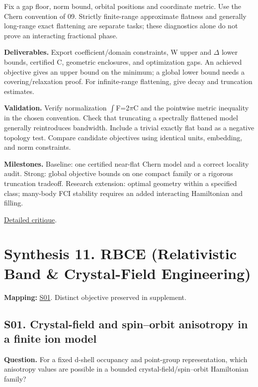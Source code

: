 \documentclass[
  11pt,
]{article}
\begin{document}
Fix a gap floor, norm bound, orbital positions and coordinate metric.
Use the Chern convention of 09. Strictly finite-range approximate
flatness and generally long-range exact flattening are separate tasks;
these diagnostics alone do not prove an interacting fractional phase.

\textbf{Deliverables.} Export coefficient/domain constraints, W upper
and \ensuremath{\Delta} lower bounds, certified C, geometric enclosures,
and optimization gaps. An achieved objective gives an upper bound on the
minimum; a global lower bound needs a covering/relaxation proof. For
infinite-range flattening, give decay and truncation estimates.

\textbf{Validation.} Verify normalization
\ensuremath{\int}F=2\ensuremath{\pi}C and the pointwise metric
inequality in the chosen convention. Check that truncating a spectrally
flattened model generally reintroduces bandwidth. Include a trivial
exactly flat band as a negative topology test. Compare candidate
objectives using identical units, embedding, and norm constraints.

\textbf{Milestones.} Baseline: one certified near-flat Chern model and a
correct locality audit. Strong: global objective bounds on one compact
family or a rigorous truncation tradeoff. Research extension: optimal
geometry within a specified class; many-body FCI stability requires an
added interacting Hamiltonian and filling.

\href{https://github.com/rick-stevens-ai/Pure-Thought/blob/main/reviews/10-Flat-Chern-Bands.md}{Detailed
critique}.

\section{Synthesis 11. RBCE (Relativistic Band \& Crystal-Field
Engineering)}

\textbf{Mapping:}
\href{https://github.com/rick-stevens-ai/Pure-Thought/blob/main/supplemental/S01.md}{S01}.
Distinct objective preserved in supplement.

\subsection{S01. Crystal-field and spin--orbit anisotropy in a finite
ion model}

\textbf{Question.} For a fixed d-shell occupancy and point-group
representation, which anisotropy values are possible in a bounded
crystal-field/spin--orbit Hamiltonian family?
\end{document}
